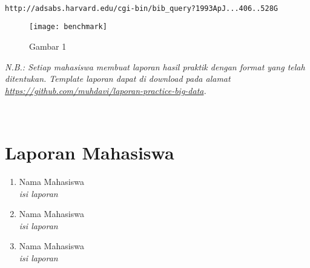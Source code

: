 \documentclass[a4paper]{tufte-handout}
\begin{document}
\hrulefill

\newpage
{}

 \\
{\tt http://adsabs.harvard.edu/cgi-bin/bib\_query?1993ApJ...406..528G}

\begin{figure}
\texttt{[image: benchmark]}
\caption{Gambar 1}
\label{gam:gambar}
\end{figure}


\hrulefill

\newpage
{}
\textit{N.B.: Setiap mahasiswa membuat laporan hasil praktik dengan format yang telah ditentukan. Template laporan dapat di download pada alamat \url{https://github.com/muhdavi/laporan-practice-big-data}.}

 \\

\section{Laporan Mahasiswa}
\begin{enumerate}
\item Nama Mahasiswa \\
\textit{isi laporan}
\item Nama Mahasiswa \\
\textit{isi laporan}
\item Nama Mahasiswa \\
\textit{isi laporan}
\end{enumerate}


\hrulefill

\newpage


\end{document}
